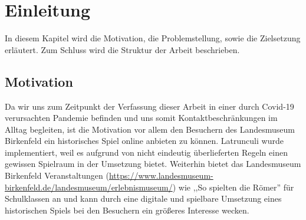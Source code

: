 
\chapter{Einleitung}
\label{ch:Latrunculi}
In diesem Kapitel wird die Motivation, die Problemstellung, sowie die Zielsetzung erläutert. Zum Schluss wird die Struktur der Arbeit beschrieben.



\section{Motivation}
\label{ch:Einleitung:sec:Motivation}
Da wir uns zum Zeitpunkt der Verfassung dieser Arbeit in einer durch Covid-19 verursachten Pandemie befinden und uns somit Kontaktbeschränkungen im Alltag begleiten, ist die Motivation vor allem den Besuchern des Landesmuseum Birkenfeld ein historisches Spiel online anbieten zu können. Latrunculi wurde implementiert, weil es aufgrund von nicht eindeutig überlieferten Regeln einen gewissen Spielraum in der Umsetzung bietet. Weiterhin bietet das Landesmuseum Birkenfeld Veranstaltungen (\url{https://www.landesmuseum-birkenfeld.de/landesmuseum/erlebnismuseum/}) wie ,,So spielten die Römer'' für Schulklassen an und kann durch eine digitale und spielbare Umsetzung  eines historischen Spiels bei den Besuchern ein größeres Interesse wecken.





